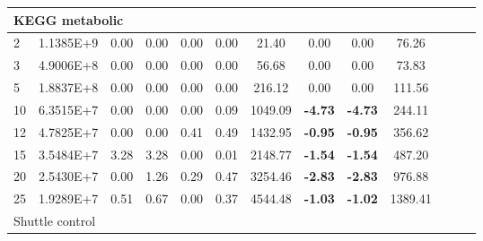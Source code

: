 {\begin{longtable}{@{}llccccccccccc@{}}
\multicolumn{10}{l}{KEGG metabolic}                                                                                                                                                                                                       \\ \hline
\multicolumn{1}{l|}{2}  & \multicolumn{1}{l|}{1.1385E+9}  & \multicolumn{1}{c|}{0.00}    & \multicolumn{1}{c|}{0.00} & \multicolumn{1}{c|}{0.00}   & 0.00 & \multicolumn{1}{c|}{21.40}    & 0.00            & 0.00            & 76.26     \\
\multicolumn{1}{l|}{3}  & \multicolumn{1}{l|}{4.9006E+8}  & \multicolumn{1}{c|}{0.00}    & \multicolumn{1}{c|}{0.00} & \multicolumn{1}{c|}{0.00}   & 0.00 & \multicolumn{1}{c|}{56.68}    & 0.00            & 0.00            & 73.83     \\
\multicolumn{1}{l|}{5}  & \multicolumn{1}{l|}{1.8837E+8}  & \multicolumn{1}{c|}{0.00}    & \multicolumn{1}{c|}{0.00} & \multicolumn{1}{c|}{0.00}   & 0.00 & \multicolumn{1}{c|}{216.12}   & 0.00            & 0.00            & 111.56    \\
\multicolumn{1}{l|}{10} & \multicolumn{1}{l|}{6.3515E+7}  & \multicolumn{1}{c|}{0.00}    & \multicolumn{1}{c|}{0.00} & \multicolumn{1}{c|}{0.00}   & 0.09 & \multicolumn{1}{c|}{1049.09}  & \textbf{-4.73}  & \textbf{-4.73}  & 244.11    \\
\multicolumn{1}{l|}{12} & \multicolumn{1}{l|}{4.7825E+7}  & \multicolumn{1}{c|}{0.00}    & \multicolumn{1}{c|}{0.00} & \multicolumn{1}{c|}{0.41}   & 0.49 & \multicolumn{1}{c|}{1432.95}  & \textbf{-0.95}  & \textbf{-0.95}  & 356.62    \\
\multicolumn{1}{l|}{15} & \multicolumn{1}{l|}{3.5484E+7}  & \multicolumn{1}{c|}{3.28}    & \multicolumn{1}{c|}{3.28} & \multicolumn{1}{c|}{0.00}   & 0.01 & \multicolumn{1}{c|}{2148.77}  & \textbf{-1.54}  & \textbf{-1.54}  & 487.20    \\
\multicolumn{1}{l|}{20} & \multicolumn{1}{l|}{2.5430E+7}  & \multicolumn{1}{c|}{0.00}    & \multicolumn{1}{c|}{1.26} & \multicolumn{1}{c|}{0.29}   & 0.47 & \multicolumn{1}{c|}{3254.46}  & \textbf{-2.83}  & \textbf{-2.83}  & 976.88    \\
\multicolumn{1}{l|}{25} & \multicolumn{1}{l|}{1.9289E+7}  & \multicolumn{1}{c|}{0.51}    & \multicolumn{1}{c|}{0.67} & \multicolumn{1}{c|}{0.00}   & 0.37 & \multicolumn{1}{c|}{4544.48}  & \textbf{-1.03}  & \textbf{-1.02}  & 1389.41   \\ \hline
\multicolumn{10}{l}{Shuttle control}                                                                                                                                                                                                      \\ \hline

\end{longtable}}
